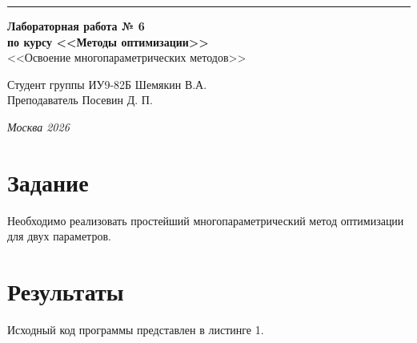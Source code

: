 \documentclass[a4paper, 14pt]{extarticle}
\begin{document}
\begin{titlepage}
\vspace*{-16pt}
\hspace{30pt}\rule{0.866\textwidth}{0.4pt}
  
\vspace{11em}

\begin{center}
\Large {\bf Лабораторная работа № 6} \\ 
\large {\bf по курсу <<Методы оптимизации>>} \\
\large <<Освоение многопараметрических методов>> 
\end{center}\normalsize

\vspace{8em}


\begin{flushright}
  {Студент группы ИУ9-82Б Шемякин В.А. \hspace*{15pt}\\ 
  \vspace{2ex}
  Преподаватель Посевин Д. П.\hspace*{15pt}}
\end{flushright}

\bigskip

\vfill
 

\begin{center}
\textsl{Москва 2026}
\end{center}
\end{titlepage}

\renewcommand{\ttdefault}{pcr}

\setlength{\tabcolsep}{3pt}
\newpage
\setcounter{page}{2}

\section{Задание}\label{Sect::task}
Необходимо реализовать простейший многопараметрический метод оптимизации для двух параметров.
\section{Результаты}\label{Sect::res}

Исходный код программы представлен в листинге 1.
\end{document}
